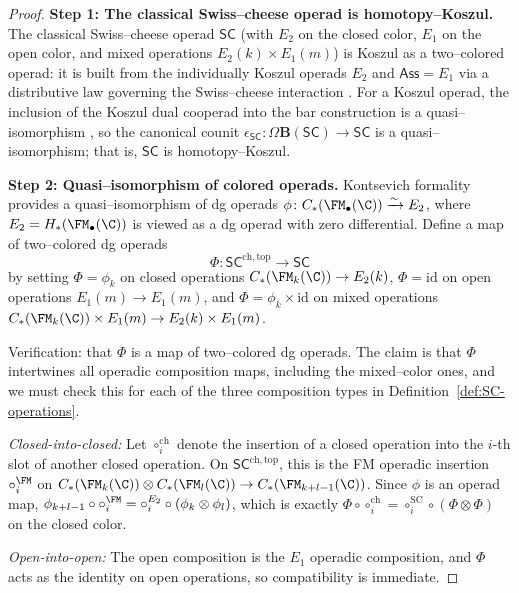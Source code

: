\begin{proof}
\textbf{Step 1: The classical Swiss--cheese operad is homotopy--Koszul.}
The classical Swiss--cheese operad $\mathsf{SC}$ (with $E_2$ on the closed
color, $E_1$ on the open color, and mixed operations
$E_2(k) \times E_1(m)$) is Koszul as a two--colored operad: it is built
from the individually Koszul operads $E_2$ \cite{GK94} and
$\mathsf{Ass} = E_1$ \cite{GK94} via a distributive law governing the
Swiss--cheese interaction \cite{Vor99,Hoe09,HL12,Val07}. For a Koszul operad, the
inclusion of the Koszul dual cooperad into the bar construction is a
quasi--isomorphism \cite{GK94}, so the canonical counit
$\epsilon_{\mathsf{SC}} \colon \Omega\mathbf{B}(\mathsf{SC}) \to
\mathsf{SC}$ is a quasi--isomorphism; that is, $\mathsf{SC}$ is
homotopy--Koszul.

\textbf{Step 2: Quasi--isomorphism of colored operads.}
Kontsevich formality \cite{Kon03} provides a quasi--isomorphism of dg
operads $\phi \colon C_\ast(\FM_\bullet(\C)) \xrightarrow{\sim} E_2$,
where $E_2 = H_\ast(\FM_\bullet(\C))$ is viewed as a dg operad with
zero differential. Define a map of two--colored dg operads
\[
 \Phi \colon \mathsf{SC}^{\mathrm{ch,top}} \longrightarrow \mathsf{SC}
\]
by setting $\Phi = \phi_k$ on closed operations
$C_\ast(\FM_k(\C)) \to E_2(k)$, $\Phi = \mathrm{id}$ on open operations
$E_1(m) \to E_1(m)$, and $\Phi = \phi_k \times \mathrm{id}$ on mixed
operations
$C_\ast(\FM_k(\C)) \times E_1(m) \to E_2(k) \times E_1(m)$.

Verification: that $\Phi$ is a map of two--colored dg operads. The claim is
that $\Phi$ intertwines all operadic composition maps, including the
mixed--color ones, and we must check this for each of the three
composition types in Definition~\ref{def:SC-operations}.

\smallskip\noindent
\emph{Closed-into-closed:}
Let $\circ_i^{\mathrm{ch}}$ denote the insertion of a closed operation
into the $i$-th slot of another closed operation.
On $\mathsf{SC}^{\mathrm{ch,top}}$, this is the FM operadic
insertion $\circ_i^{\FM}$ on
$C_\ast(\FM_k(\C)) \otimes C_\ast(\FM_l(\C)) \to C_\ast(\FM_{k+l-1}(\C))$.
Since $\phi$ is an operad map,
$\phi_{k+l-1} \circ \circ_i^{\FM} = \circ_i^{E_2} \circ (\phi_k \otimes \phi_l)$,
which is exactly $\Phi \circ \circ_i^{\mathrm{ch}} = \circ_i^{\mathrm{SC}} \circ (\Phi \otimes \Phi)$
on the closed color.

\smallskip\noindent
\emph{Open-into-open:}
The open composition is the $E_1$ operadic composition, and $\Phi$
acts as the identity on open operations, so compatibility is
immediate.


\end{proof}
